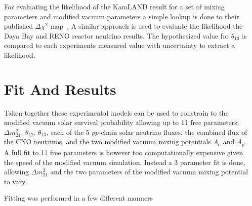 For evaluating the likelihood of the KamLAND result for a set of
mixing parameters and modified vacuum parameters a simple lookup
is done to their published $\Delta \chi^{2}$ map~\cite{kamland_data_release}.
A similar approach is used to evaluate the likelihood the Daya Bay and
RENO reactor neutrino results. 
The hypothesized value for $\theta_{13}$ is compared to each
experiments measured value with uncertainty to extract a likelihood.


\section{Fit And Results}
Taken together these experimental models can be used to constrain
to the modified vacuum solar survival probability allowing up to
11 free parameters: $\Delta m^{2}_{21}$, $\theta_{12}$, $\theta_{13}$,
each of the 5 $pp$-chain solar neutrino fluxes, the combined flux of the
CNO neutrinos, and the two modified vacuum mixing potentials $A_{\mathrm{e}}$
and $A_{\mathrm{\mu}}$.
A full fit to 11 free parameters is however too computationally
expensive given the speed of the modified vacuum simulation.
Instead a 3 parameter fit is done, allowing $\Delta m^{2}_{21}$ and the
two parameters of the modified vacuum mixing potential to vary.

Fitting was performed in a few different manners

